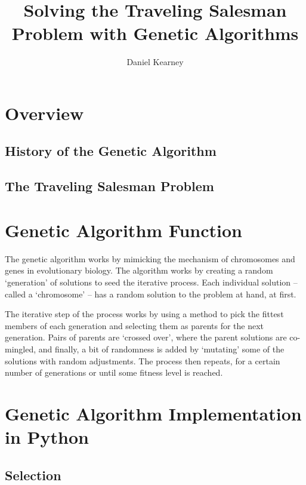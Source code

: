 \documentclass[UTF8]{report}
\begin{document}
\title{%
  Solving the Traveling Salesman Problem with Genetic Algorithms 
}

\author{Daniel Kearney}

\maketitle

\tableofcontents
\pagebreak

\section{Overview}

\subsection{History of the Genetic Algorithm}

\subsection{The Traveling Salesman Problem}

\section{Genetic Algorithm Function}

The genetic algorithm works by mimicking the mechanism of chromosomes and genes in evolutionary biology. The algorithm works by creating a random `generation' of solutions to seed the iterative process. Each individual solution -- called a `chromosome' -- has a random solution to the problem at hand, at first. 

The iterative step of the process works by using a method to pick the fittest members of each generation and selecting them as parents for the next generation. Pairs of parents are `crossed over', where the parent solutions are co-mingled, and finally, a bit of randomness is added by `mutating' some of the solutions with random adjustments. The process then repeats, for a certain number of generations or until some fitness level is reached. 

\section{Genetic Algorithm Implementation in Python}

\subsection{Selection}
\end{document}
